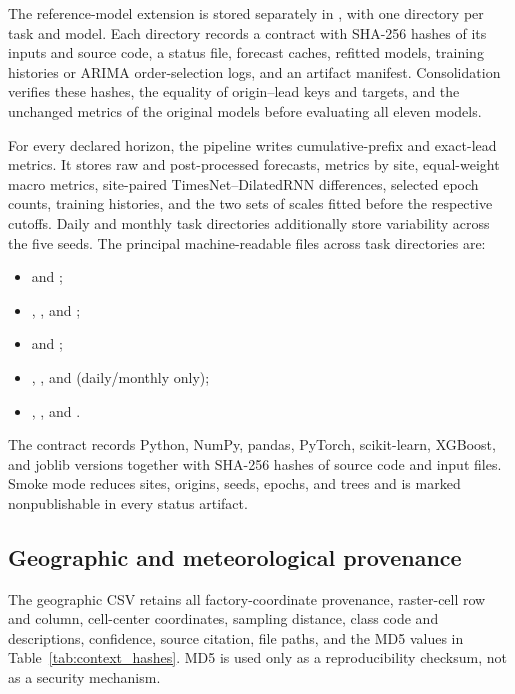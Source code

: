 The reference-model extension is stored separately in
, with one directory per task and
model. Each directory records a contract with SHA-256 hashes of its inputs
and source code, a status file, forecast caches, refitted models, training
histories or ARIMA order-selection logs, and an artifact manifest.
Consolidation verifies these hashes, the equality of origin--lead keys and
targets, and the unchanged metrics of the original models before evaluating
all eleven models.

For every declared horizon, the pipeline writes cumulative-prefix and
exact-lead metrics. It stores raw and post-processed forecasts, metrics by site,
equal-weight macro metrics, site-paired TimesNet--DilatedRNN differences,
selected epoch counts, training histories, and the two sets of scales fitted before the respective cutoffs.
Daily and monthly task directories additionally store variability across the
five seeds. The principal machine-readable files across task directories are:
\begin{itemize}
  \item {} and
        ;
  \item {},
        , and
        ;
  \item {} and
        ;
  \item {},
        , and
         (daily/monthly only);
  \item {},
        , and
        .
\end{itemize}
The contract records Python, NumPy, pandas, PyTorch, scikit-learn, XGBoost, and
joblib versions together with SHA-256 hashes of source code and input files.
Smoke mode reduces sites, origins, seeds, epochs, and trees and is marked
nonpublishable in every status artifact.

\subsection{Geographic and meteorological provenance}

The geographic CSV retains all factory-coordinate provenance, raster-cell
row and column, cell-center coordinates, sampling distance, class code and
descriptions, confidence, source citation, file paths, and the MD5 values in
Table~\ref{tab:context_hashes}. MD5 is used only as a reproducibility checksum,
not as a security mechanism.

